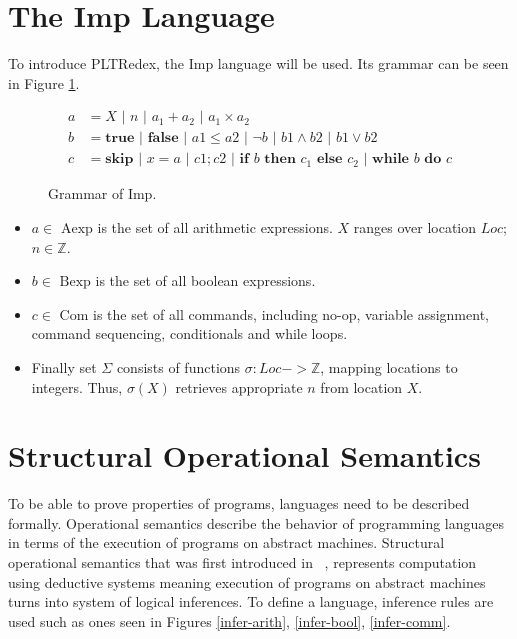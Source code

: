 
\section{The Imp Language}

To introduce PLTRedex, the Imp language will be used. Its grammar can be seen in Figure \ref{imp-grammar}.

\begin{figure}[htb]
\begin{align*}
a &= X \text{ | } n \text{ | } a_1 + a_2 \text{ | } a_1 \times a_2 \\
b &= \textbf{true} \text{ | } \textbf{false} \text{ | } a1 \leq a2 \text{ | } \neg b \text{ | } b1 \land b2 \text{ | } b1 \lor b2 \\
c &= \textbf{skip} \text{ | } x = a \text{ | } c1; c2 \text{ | } \textbf{if } b \textbf{ then } c_1 \textbf{ else } c_2 \text{ | } \textbf{while } b \textbf{ do } c
\end{align*}
\caption{Grammar of Imp.}
\label{imp-grammar}
\end{figure}

\begin{itemize}
\item $a \in \text{ Aexp}$ is the set of all arithmetic expressions. $X$ ranges over location $Loc$; $n \in \mathbb{Z}$.
\item $b \in \text{ Bexp}$ is the set of all boolean expressions.
\item $c \in \text{ Com}$ is the set of all commands, including no-op, variable assignment, command sequencing, conditionals and while loops.
\item Finally set $\Sigma$ consists of functions $\sigma: Loc -> \mathbb{Z}$, mapping locations to integers. Thus, $\sigma(X)$ retrieves appropriate $n$ from location $X$.
\end{itemize}


\section{Structural Operational Semantics}
To be able to prove properties of programs, languages need to be described formally. Operational semantics describe the behavior of programming languages in terms of the execution of programs on abstract machines. Structural operational semantics that was first introduced in ~\cite{plotkin}, represents computation using deductive systems meaning execution of programs on abstract machines turns into system of logical inferences. To define a language, inference rules are used such as ones seen in Figures \ref{infer-arith}, \ref{infer-bool}, \ref{infer-comm}.

